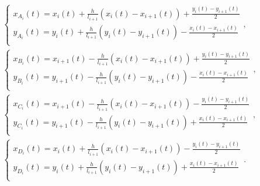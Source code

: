 \documentclass[../main.tex]{subfiles}
\begin{document}
     \begin{gather}
     \begin{cases}
     x_{A_i}\left( t \right) =x_i\left( t \right) +\frac{h}{l_{i+1}}\left( x_i\left( t \right) -x_{i+1}\left( t \right) \right) +\frac{y_i\left( t \right) -y_{i+1}\left( t \right)}{2}\\ \label{1.........24}
     y_{A_i}\left( t \right) =y_i\left( t \right) +\frac{h}{l_{i+1}}\left( y_i\left( t \right) -y_{i+1}\left( t \right) \right) -\frac{x_i\left( t \right) -x_{i+1}\left( t \right)}{2}\\ 
     \end{cases},
     \\
     \begin{cases}
     x_{B_i}\left( t \right) =x_{i+1}\left( t \right) -\frac{h}{l_{i+1}}\left( x_i\left( t \right) -x_{i+1}\left( t \right) \right) +\frac{y_i\left( t \right) -y_{i+1}\left( t \right)}{2}\\ \label{1.........26}
     y_{B_i}\left( t \right) =y_{i+1}\left( t \right) -\frac{h}{l_{i+1}}\left( y_i\left( t \right) -y_{i+1}\left( t \right) \right) -\frac{x_i\left( t \right) -x_{i+1}\left( t \right)}{2}\\ 
     \end{cases},
     \\
     \begin{cases}
     x_{C_i}\left( t \right) =x_{i+1}\left( t \right) -\frac{h}{l_{i+1}}\left( x_i\left( t \right) -x_{i+1}\left( t \right) \right) -\frac{y_i\left( t \right) -y_{i+1}\left( t \right)}{2}\\ \label{1.........28}
     y_{C_i}\left( t \right) =y_{i+1}\left( t \right) -\frac{h}{l_{i+1}}\left( y_i\left( t \right) -y_{i+1}\left( t \right) \right) +\frac{x_i\left( t \right) -x_{i+1}\left( t \right)}{2}\\ 
     \end{cases},
     \\
     \begin{cases}
     x_{D_i}\left( t \right) =x_i\left( t \right) +\frac{h}{l_{i+1}}\left( x_i\left( t \right) -x_{i+1}\left( t \right) \right) -\frac{y_i\left( t \right) -y_{i+1}\left( t \right)}{2}\\   \label{1.........30}
     y_{D_i}\left( t \right) =y_i\left( t \right) +\frac{h}{l_{i+1}}\left( y_i\left( t \right) -y_{i+1}\left( t \right) \right) +\frac{x_i\left( t \right) -x_{i+1}\left( t \right)}{2}\\   
     \end{cases}.
     \end{gather}
\end{document}
